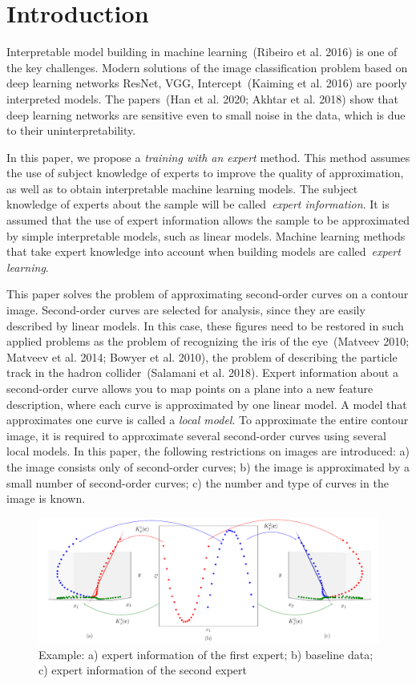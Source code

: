 \section{Introduction}
\label{intro}
Interpretable model building in machine learning~(Ribeiro et al. 2016) is one of the key challenges.
Modern solutions of the image classification problem based on deep learning networks ResNet, VGG, Intercept~(Kaiming et al. 2016) are poorly interpreted models.
The papers~(Han et al. 2020; Akhtar et al. 2018) show that deep learning networks are sensitive even to small noise in the data, which is due to their uninterpretability.

In this paper, we propose a \textit {training with an expert} method.
This method assumes the use of subject knowledge of experts to improve the quality of approximation, as well as to obtain interpretable machine learning models.
The subject knowledge of experts about the sample will be called~\textit {expert information}.
It is assumed that the use of expert information allows the sample to be approximated by simple interpretable models, such as linear models. Machine learning methods that take expert knowledge into account when building models are called~\textit {expert learning}.

This paper solves the problem of approximating second-order curves on a contour image. Second-order curves are selected for analysis, since they are easily described by linear models. In this case, these figures need to be restored in such applied problems as the problem of recognizing the iris of the eye~(Matveev 2010; Matveev et al. 2014; Bowyer et al. 2010), the problem of describing the particle track in the hadron collider~(Salamani et al. 2018). Expert information about a second-order curve allows you to map points on a plane into a new feature description, where each curve is approximated by one linear model. A model that approximates one curve is called a \textit {local model}. To approximate the entire contour image, it is required to approximate several second-order curves using several local models. In this paper, the following restrictions on images are introduced: a) the image consists only of second-order curves; b) the image is approximated by a small number of second-order curves; c) the number and type of curves in the image is known.

\begin{figure}[h!]
     \includegraphics[width=\textwidth]{explanation}
     \caption {Example: a) expert information of the first expert; b) baseline data; c) expert information of the second expert}
    \label{intro:fig2}
\end{figure}

